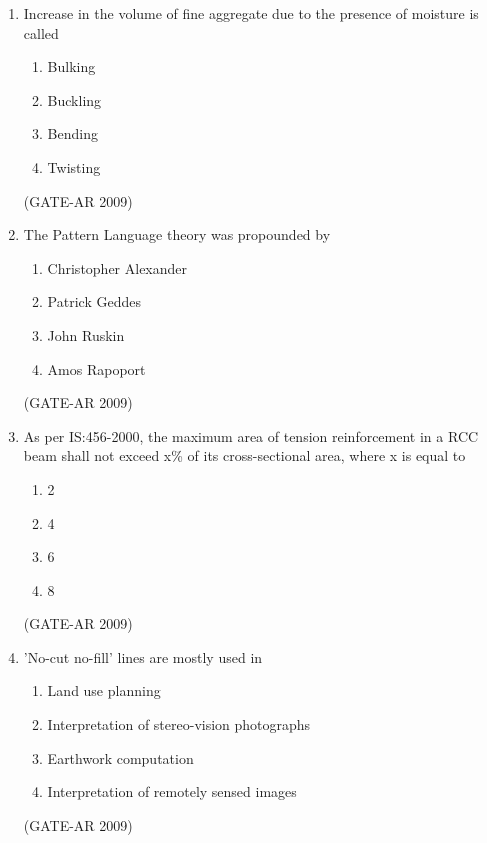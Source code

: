 \documentclass[a4paper,10pt]{article}
\begin{document}
\begin{enumerate}
    \item Increase in the volume of fine aggregate due to the presence of moisture is called 
    \begin{multicols}{4}
	\begin{enumerate}
        \item Bulking
        \item Buckling
        \item Bending
        \item Twisting
    \end{enumerate}
	\end{multicols}
    \hfill (GATE-AR 2009)
    
    \item The Pattern Language theory was propounded by 
    \begin{multicols}{2}
	\begin{enumerate}
        \item Christopher Alexander
        \item Patrick Geddes
        \item John Ruskin
        \item Amos Rapoport
    \end{enumerate}
	\end{multicols}
    \hfill (GATE-AR 2009)
    
    \item As per IS:456-2000, the maximum area of tension reinforcement in a RCC beam shall not exceed x\% of its cross-sectional area, where x is equal to 
    \begin{multicols}{4}
	\begin{enumerate}
        \item 2
        \item 4
        \item 6
        \item 8
    \end{enumerate}
	\end{multicols}
    \hfill (GATE-AR 2009)
    
    \item 'No-cut no-fill' lines are mostly used in 
    \begin{multicols}{2}
	\begin{enumerate}
        \item Land use planning
        \item Interpretation of stereo-vision photographs
        \item Earthwork computation
        \item Interpretation of remotely sensed images
    \end{enumerate}
	\end{multicols}
    \hfill (GATE-AR 2009)
    

\end{enumerate}
\end{document}
